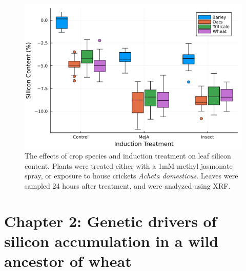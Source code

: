 \documentclass[12pt, letterpaper, ]{article}
\begin{document}
\begin{figure}[h]
        \includegraphics[width = \textwidth]{images/induction_plot.png}
        \centering
        \caption{The effects of crop species and induction treatment on leaf silicon content. Plants were treated either with a 1mM methyl jasmonate spray, or exposure to house crickets \textit{Acheta domesticus}. Leaves were sampled 24 hours after treatment, and were analyzed using XRF.}
\end{figure}

\clearpage



\section{Chapter 2: Genetic drivers of silicon accumulation in a wild ancestor of wheat}
\end{document}
